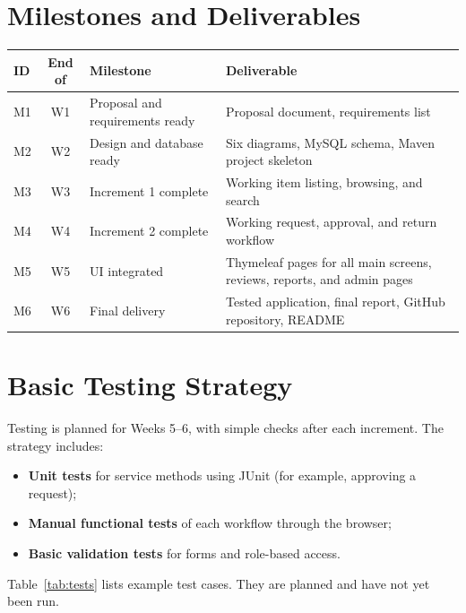 \documentclass[11pt,a4paper]{article}
\begin{document}
\section{Milestones and Deliverables}
\begin{tabularx}{\textwidth}{@{}l c l X@{}}
\toprule
\textbf{ID} & \textbf{End of} & \textbf{Milestone} & \textbf{Deliverable}\\
\midrule
M1 & W1 & Proposal and requirements ready & Proposal document, requirements list\\
M2 & W2 & Design and database ready & Six diagrams, MySQL schema, Maven project skeleton\\
M3 & W3 & Increment 1 complete & Working item listing, browsing, and search\\
M4 & W4 & Increment 2 complete & Working request, approval, and return workflow\\
M5 & W5 & UI integrated & Thymeleaf pages for all main screens, reviews, reports, and admin pages\\
M6 & W6 & Final delivery & Tested application, final report, GitHub repository, README\\
\bottomrule
\end{tabularx}

\section{Basic Testing Strategy}
Testing is planned for Weeks 5--6, with simple checks after each increment. The strategy includes:
\begin{itemize}
  \item \textbf{Unit tests} for service methods using JUnit (for example, approving a request);
  \item \textbf{Manual functional tests} of each workflow through the browser;
  \item \textbf{Basic validation tests} for forms and role-based access.
\end{itemize}
Table~\ref{tab:tests} lists example test cases. They are planned and have not yet been run.
\end{document}
